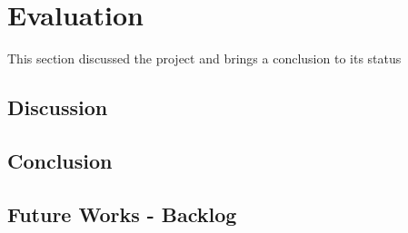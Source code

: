 \chapter{Evaluation}\label{chap:evaluation}
This section discussed the project and brings a conclusion to its status

\section{Discussion}


\section{Conclusion}


\section{Future Works - Backlog}
